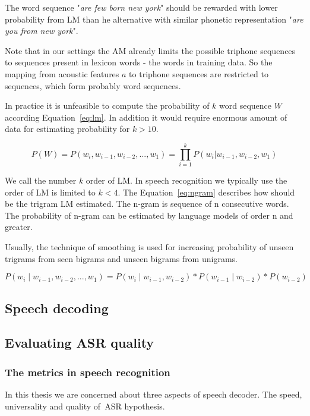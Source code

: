{The word sequence "{\it are few born new york}" should be rewarded 
with lower probability from \ac{LM} than he alternative with similar phonetic representation
"{\it are you from new york}".

Note that in our settings the \ac{AM} already limits the possible triphone
sequences to sequences present in lexicon words - the words in training data.
So the mapping from acoustic features $a$ to triphone sequences
are restricted to sequences, which form probably word sequences.

In practice it is unfeasible to compute the probability
of $k$ word sequence $W$ according Equation~\ref{eq:lm}.
In addition it would require enormous amount of data for estimating
probability for $k>10$.


\begin{equation} \label{eq:lm}
    P(W)=P(w_i,  w_{i-1}, w_{i-2}, ..., w_1)=\prod_{i=1}^{k}{P(w_i|w_{i-1}, w_{i-2}, w_1)}
\end{equation}

We call the number $k$ order of \ac{LM}.
In speech recognition we typically use the order of \ac{LM} is limited to $k<4$.
The Equation~\ref{eq:ngram} describes how should be the trigram \ac{LM} estimated.
The n-gram is sequence of n consecutive words. The probability of n-gram can be estimated by language models
of order n and greater.

Usually, the technique of smoothing \cite{TODO} is used for increasing probability of unseen trigrams
from seen bigrams and unseen bigrams from unigrams.

\begin{equation} \label{eq:ngram}
    P(w_i \mid w_{i-1}, w_{i-2}, ..., w_1) = P(w_i \mid w_{i-1}, w_{i-2}) * P(w_{i-1} \mid w_{i-2}) * P(w_{i-2})
\end{equation}

\subsection{Speech decoding}
\label{sub:decode}

\subsection{Evaluating \ac{ASR} quality}
\label{sub:eval}

\subsubsection*{The metrics in speech recognition}
\label{sub:the_metrics_in_speech_recognition}
In this thesis we are concerned about three aspects of speech decoder.
The speed, universality and quality of~\ac{ASR} hypothesis.

}
